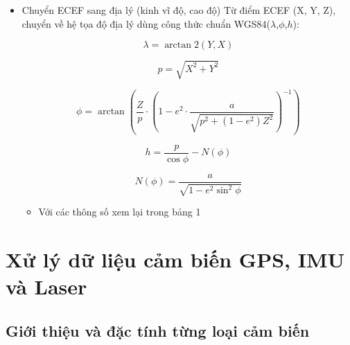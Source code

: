 \begin{itemize}
\begin{itemize}
    \item $\lambda$ là kinh độ, $\phi$ là vĩ độ, $Observer_{ECEF}$ được tính theo phần 2.5.1
\end{itemize}
    \item Chuyển ECEF sang địa lý (kinh vĩ độ, cao độ)
    Từ điểm ECEF (X, Y, Z), chuyển về hệ tọa độ địa lý dùng công thức chuẩn WGS84($\lambda$,$\phi$,$h$):
    

\[
\lambda = \arctan2(Y, X)
\]

\[
p = \sqrt{X^2 + Y^2}
\]

\[
\phi = \arctan \!\left( 
   \frac{Z}{p} \cdot 
   \left( 1 - e^2 \cdot \frac{a}{\sqrt{p^2 + (1 - e^2)Z^2}} \right)^{-1} 
\right)
\]

\[
h = \frac{p}{\cos\phi} - N(\phi)
\]

\[
N(\phi) = \frac{a}{\sqrt{1 - e^2 \sin^2\phi}}
\]
    \begin{itemize}
        \item Với các thông số xem lại trong bảng 1
    \end{itemize}

\end{itemize}
\newpage
\section{Xử lý dữ liệu cảm biến GPS, IMU và Laser}
\subsection{Giới thiệu và đặc tính từng loại cảm biến}
